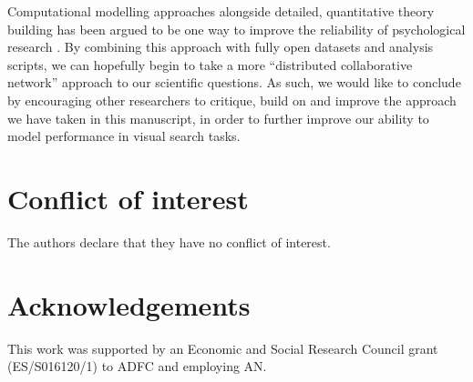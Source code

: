 \documentclass[preprint,12pt,authoryear]{elsarticle}
\begin{document}
Computational modelling approaches alongside detailed, quantitative theory building has been argued to be one way to improve the reliability of psychological research \citep{oberauer2019addressing, guest2021computational}. By combining this approach with fully open datasets and analysis scripts, we can hopefully begin to take a more ``distributed collaborative network'' approach \citep{moshontz2018psychological} to our scientific questions. As such, we would like to conclude by encouraging other researchers to critique, build on and improve the approach we have taken in this manuscript, in order to further improve our ability to model performance in visual search tasks. 

%
\section*{Conflict of interest}
The authors declare that they have no conflict of interest.

\section*{Acknowledgements}
This work was supported by an Economic and Social Research Council grant (ES/S016120/1) to ADFC and employing AN.

\end{document}
